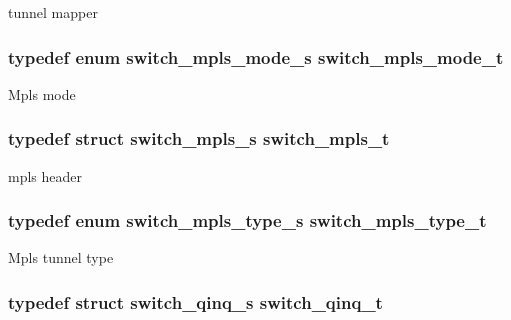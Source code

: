 tunnel mapper \hypertarget{group__Tunnel_ga31b707543626fd0d899f011a2bf91fc9}{
\subsubsection[{switch\+\_\+mpls\+\_\+mode\+\_\+t}]{\setlength{\rightskip}{0pt plus 5cm}typedef enum {\bf switch\+\_\+mpls\+\_\+mode\+\_\+s}  {\bf switch\+\_\+mpls\+\_\+mode\+\_\+t}}}\label{group__Tunnel_ga31b707543626fd0d899f011a2bf91fc9}
Mpls mode \hypertarget{group__Tunnel_gaa1a400888248e1e756adbd37f010f288}{
\subsubsection[{switch\+\_\+mpls\+\_\+t}]{\setlength{\rightskip}{0pt plus 5cm}typedef struct {\bf switch\+\_\+mpls\+\_\+s}  {\bf switch\+\_\+mpls\+\_\+t}}}\label{group__Tunnel_gaa1a400888248e1e756adbd37f010f288}
mpls header \hypertarget{group__Tunnel_ga9757d049be2922674f9c5350384ff3ae}{
\subsubsection[{switch\+\_\+mpls\+\_\+type\+\_\+t}]{\setlength{\rightskip}{0pt plus 5cm}typedef enum {\bf switch\+\_\+mpls\+\_\+type\+\_\+s}  {\bf switch\+\_\+mpls\+\_\+type\+\_\+t}}}\label{group__Tunnel_ga9757d049be2922674f9c5350384ff3ae}
Mpls tunnel type \hypertarget{group__Tunnel_gaf7119659216df7efc9b7453d85ab2451}{
\subsubsection[{switch\+\_\+qinq\+\_\+t}]{\setlength{\rightskip}{0pt plus 5cm}typedef struct {\bf switch\+\_\+qinq\+\_\+s}  {\bf switch\+\_\+qinq\+\_\+t}}}\label{group__Tunnel_gaf7119659216df7efc9b7453d85ab2451}
